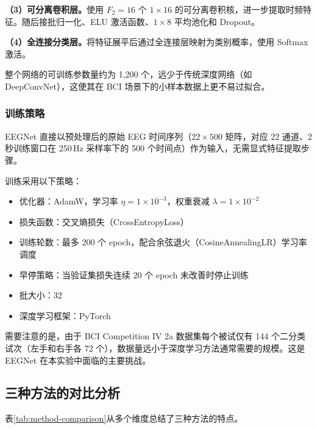 \textbf{（3）可分离卷积层。}使用 $F_2 = 16$ 个 $1 \times 16$ 的可分离卷积核，进一步提取时频特征。随后接批归一化、ELU 激活函数、$1 \times 8$ 平均池化和 Dropout。

\textbf{（4）全连接分类层。}将特征展平后通过全连接层映射为类别概率，使用 Softmax 激活。

整个网络的可训练参数量约为 1,200 个，远少于传统深度网络（如 DeepConvNet），这使其在 BCI 场景下的小样本数据上更不易过拟合。

\subsubsection{训练策略}

EEGNet 直接以预处理后的原始 EEG 时间序列（$22 \times 500$ 矩阵，对应 22 通道、2 秒训练窗口在 250\,Hz 采样率下的 500 个时间点）作为输入，无需显式特征提取步骤。

训练采用以下策略：
\begin{itemize}[leftmargin=2em]
	\item 优化器：AdamW，学习率 $\eta = 1 \times 10^{-3}$，权重衰减 $\lambda = 1 \times 10^{-2}$
	\item 损失函数：交叉熵损失（CrossEntropyLoss）
	\item 训练轮数：最多 200 个 epoch，配合余弦退火（CosineAnnealingLR）学习率调度
	\item 早停策略：当验证集损失连续 20 个 epoch 未改善时停止训练
	\item 批大小：32
	\item 深度学习框架：PyTorch
\end{itemize}

需要注意的是，由于 BCI Competition IV 2a 数据集每个被试仅有 144 个二分类试次（左手和右手各 72 个），数据量远小于深度学习方法通常需要的规模。这是 EEGNet 在本实验中面临的主要挑战。

\subsection{三种方法的对比分析}

表\ref{tab:method-comparison}从多个维度总结了三种方法的特点。


